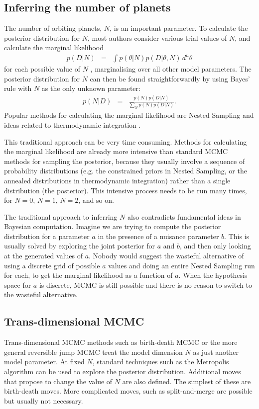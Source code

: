 \documentclass[useAMS,usenatbib]{mn2e}
\begin{document}
\subsection{Inferring the number of planets}
The number of orbiting planets, $N$, is an important parameter.
To calculate the posterior distribution for $N$, most authors
consider various trial values of $N$, and calculate the marginal likelihood
\begin{eqnarray}
p(D | N) &=& \int p(\theta | N) p(D | \theta, N) \, d^n \theta
\end{eqnarray}
for each possible value of $N$
\citep[e.g.][]{2011MNRAS.415.2523G, 2011MNRAS.415.3462F, 2014MNRAS.437.3540F, fengji}, marginalising
over all other model parameters.
The posterior distribution for $N$ can then be found straightforwardly by
using Bayes' rule with $N$ as the only unknown parameter:
\begin{eqnarray}
p(N | D) &=& \frac{p(N)p(D | N)}{\sum_N p(N)p(D | N)}.
\end{eqnarray}
Popular
methods for calculating the marginal likelihood are Nested Sampling
\citep{skilling} and ideas related to thermodynamic integration
\citep[e.g.][]{neal}.

This traditional approach can be very time consuming.
Methods for calculating the marginal likelihood are
already more intensive than standard MCMC methods for sampling the posterior,
because they usually involve a sequence of probability distributions
(e.g. the constrained priors in Nested Sampling, or the annealed distributions
in thermodynamic integration) rather than a single distribution (the posterior).
This intensive process needs to be run many times, for $N=0$, $N=1$, $N=2$, and
so on.

The traditional approach to inferring $N$ also contradicts
fundamental ideas in Bayesian
computation. Imagine we are trying to compute the posterior distribution for
a parameter $a$ in the presence of a nuisance parameter $b$. This is usually solved
by exploring the joint posterior for $a$ and $b$, and then only looking at the
generated values of $a$. Nobody would suggest the wasteful alternative
of using a discrete grid of possible $a$ values and doing an entire Nested
Sampling run for each, to get the marginal likelihood as a function of $a$.
When the hypothesis space for $a$ is discrete, MCMC is still possible and there
is no reason to switch to the wasteful alternative.

\subsection{Trans-dimensional MCMC}
Trans-dimensional MCMC methods such as birth-death MCMC \citep{birthdeath} or the
more general reversible jump MCMC \citep{green} treat the model dimension
$N$ as just another model parameter. At fixed $N$, standard techniques such
as the Metropolis algorithm can be used to explore the posterior distribution.
Additional moves that propose to change the value of $N$ are also defined. The
simplest of these are birth-death moves. More complicated moves, such as
split-and-merge \citep[e.g.][]{umstatter} are possible but usually not necessary.
\end{document}
